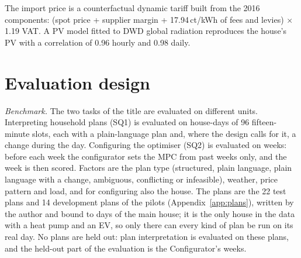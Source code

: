 \documentclass[12pt,a4paper]{report}
\begin{document}
The import price is a counterfactual dynamic tariff built from the 2016
components: (spot price + supplier margin + 17.94\,ct/kWh of fees and
levies) $\times$ 1.19 VAT. A PV model fitted to DWD global radiation
reproduces the house's PV with a correlation of 0.96 hourly and 0.98
daily.

\section{Evaluation design}
\label{sec:evaldesign}

\textit{Benchmark.} The two tasks of the title are evaluated on
different units. Interpreting household plans (SQ1) is evaluated on
house-days of 96 fifteen-minute slots, each with a plain-language plan
and, where the design calls for it, a change during the day.
Configuring the optimiser (SQ2) is evaluated on weeks: before each week
the configurator sets the MPC from past weeks only, and the week is then
scored. Factors are the plan type (structured, plain language,
plain language with a change, ambiguous, conflicting or infeasible),
weather, price pattern and load, and for configuring also the house.
The plans are the 22 test plans and 14 development plans of the pilots
(Appendix~\ref{app:plans}), written by the author and bound to days of
the main house; it is the only house in the data with a heat pump and
an EV, so only there can every kind of plan be run on its real day. No
plans are held out: plan interpretation is evaluated on these plans,
and the held-out part of the evaluation is the Configurator's weeks.
\end{document}
